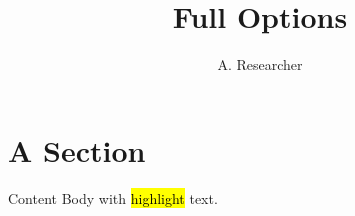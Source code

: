 \documentclass{beamer}
\title{Full Options}
\author{A. Researcher}
\begin{document}
{
\begin{frame}[plain]\titlepage\end{frame}
}
\section{A Section}
\begin{frame}{Content}
Body with \hl{highlight} text.
\end{frame}
\end{document}
